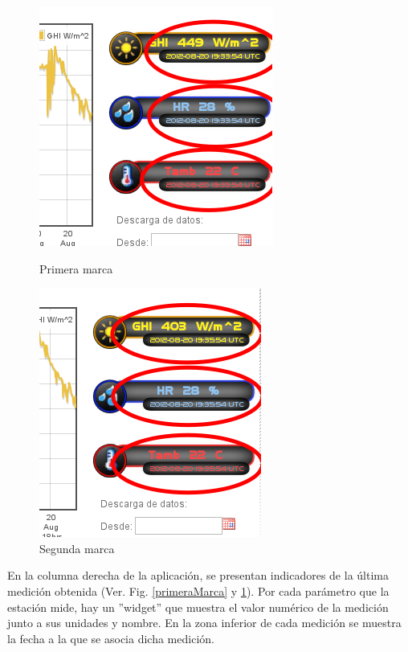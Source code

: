 \begin{figure}[h]
	\begin{minipage}[b]{0.45\linewidth}
		\centering
		\includegraphics[scale=0.5]{./images/cap5chap1img5-1}
		\caption{Primera marca}
		\label{primeraMarca}
	\end{minipage}
	\begin{minipage}[b]{0.45\linewidth}
		\centering
                \includegraphics[scale=0.5]{./images/cap5chap1img5-2}
                \caption{Segunda marca}
                \label{segundaMarca}
	\end{minipage}
\end{figure}
En la columna derecha de la aplicación, se presentan indicadores de la última medición obtenida (Ver. Fig. \ref{primeraMarca} y \ref{segundaMarca}). Por cada parámetro que la estación mide, hay un ''widget'' que muestra el valor numérico de la medición junto a sus unidades y nombre. En la zona inferior de cada medición se muestra la fecha a la que se asocia dicha medición.

